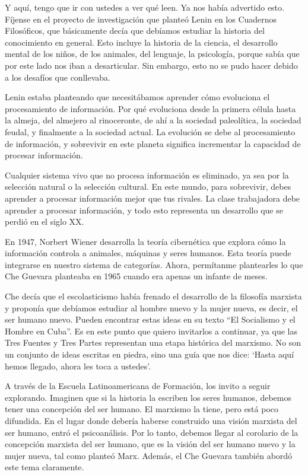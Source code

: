 \documentclass[
  jou,
  floatsintext,
  longtable,
  a4paper,
  nolmodern,
  notxfonts,
  notimes,
  colorlinks=true,linkcolor=blue,citecolor=blue,urlcolor=blue]{apa7}
\begin{document}
Y aquí, tengo que ir con ustedes a ver qué leen. Ya nos había advertido
esto. Fíjense en el proyecto de investigación que planteó Lenin en los
Cuadernos Filosóficos, que básicamente decía que debíamos estudiar la
historia del conocimiento en general. Esto incluye la historia de la
ciencia, el desarrollo mental de los niños, de los animales, del
lenguaje, la psicología, porque sabía que por este lado nos iban a
desarticular. Sin embargo, esto no se pudo hacer debido a los desafíos
que conllevaba.

Lenin estaba planteando que necesitábamos aprender cómo evoluciona el
procesamiento de información. Por qué evoluciona desde la primera célula
hasta la almeja, del almejero al rinoceronte, de ahí a la sociedad
paleolítica, la sociedad feudal, y finalmente a la sociedad actual. La
evolución se debe al procesamiento de información, y sobrevivir en este
planeta significa incrementar la capacidad de procesar información.

Cualquier sistema vivo que no procesa información es eliminado, ya sea
por la selección natural o la selección cultural. En este mundo, para
sobrevivir, debes aprender a procesar información mejor que tus rivales.
La clase trabajadora debe aprender a procesar información, y todo esto
representa un desarrollo que se perdió en el siglo XX.

En 1947, Norbert Wiener desarrolla la teoría cibernética que explora
cómo la información controla a animales, máquinas y seres humanos. Esta
teoría puede integrarse en nuestro sistema de categorías. Ahora,
permítanme plantearles lo que Che Guevara planteaba en 1965 cuando era
apenas un infante de meses.

Che decía que el escolasticismo había frenado el desarrollo de la
filosofía marxista y proponía que debíamos estudiar al hombre nuevo y la
mujer nueva, es decir, el ser humano nuevo. Pueden encontrar estas ideas
en su texto ``El Socialismo y el Hombre en Cuba''. Es en este punto que
quiero invitarlos a continuar, ya que las Tres Fuentes y Tres Partes
representan una etapa histórica del marxismo. No son un conjunto de
ideas escritas en piedra, sino una guía que nos dice: `Hasta aquí hemos
llegado, ahora les toca a ustedes'.

A través de la Escuela Latinoamericana de Formación, los invito a seguir
explorando. Imaginen que si la historia la escriben los seres humanos,
debemos tener una concepción del ser humano. El marxismo la tiene, pero
está poco difundida. En el lugar donde debería haberse construido una
visión marxista del ser humano, entró el psicoanálisis. Por lo tanto,
debemos llegar al corolario de la concepción marxista del ser humano,
que es la visión del ser humano nuevo y la mujer nueva, tal como planteó
Marx. Además, el Che Guevara también abordó este tema claramente.
\end{document}
